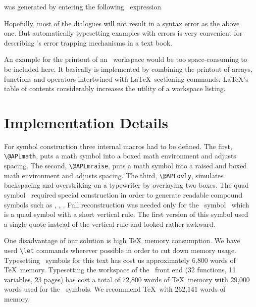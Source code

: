 {\parindent=0pt
was generated by entering the following \APL\ expression
}
 
%
 
{\parsep=0pt %
\begin{APLbold}\begin{APLexpr}
\APLquote\APLE\APLquote\APLspace\APLP
\APLR\APLT\APLE\APLX\protect\APLunderbar\APLD\APLI\APLA\APLL
\APLO\APLG\APLspace\APLquote
\APLleftparen\APLone\APLleftparen\APLtwo\APLbr\APLspace
\APLthree\APLrightparen\APLfour\APLbr\APLquote
\end{APLexpr}\end{APLbold}
}           %
 
Hopefully, most of the dialogues will not result in a
syntax error as the above one. But automatically typesetting
examples with errors is very convenient for describing
\APL's error trapping mechanisms in a text book.
 
An example for the printout of an \APL\ workspace would
be too space-consuming to be included here. It basically
is implemented by combining the printout of arrays, functions
and operators intertwined with \LaTeX\ sectioning commands.
\LaTeX's table of contents considerably increases the
utility of a workspace listing.
 
\section{Implementation Details}
 
For symbol construction three internal macros had to be defined.
The first, \verb+\@APLmath+, puts a math symbol into a boxed
math environment and adjusts spacing. The second, \verb+\@APLmraise+,
puts a math symbol into a raised and boxed math environment and
adjusts spacing. The third, \verb+\@APLovly+, simulates backspacing
and overstriking on a typewriter by overlaying two boxes. The
quad symbol \APLquad\ required special construction in order to
generate readable compound symbols such as \APLquadslope, \APLquaddivide,
\APLquadrightarrow.
Full reconstruction was needed only for the \APL\ symbol \APLquadquote\
which is a quad symbol with a short vertical rule. The
first version of this symbol used a single quote instead
of the vertical rule and looked rather awkward.
 
One disadvantage of our solution is high \TeX\ memory consumption.
We have used \verb+\let+ commands wherever possible in order to
cut down memory usage.
Typesetting \APL\ symbols for this text has cost us approximately
6,800 words of \TeX\ memory. Typesetting the workspace of
the \APL\ front end (32 functions, 11 variables, 23 pages)
has cost a total of 72,800 words
of \TeX\ memory with 29,000 words used for the \APL\ symbols.
We recommend \TeX\ with 262,141 words of memory.
 
